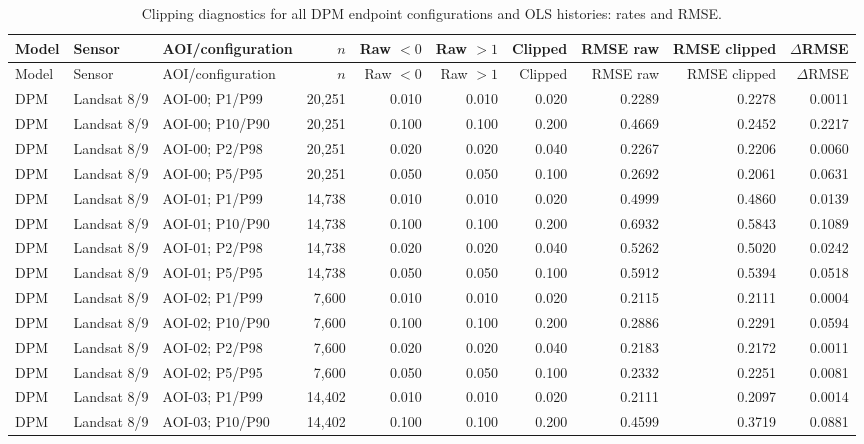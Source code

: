 \begin{landscape}\tiny
\setlength{\LTleft}{0pt}\setlength{\LTright}{0pt}
\begin{longtable}{lllrrrrrrr}
\caption{Clipping diagnostics for all DPM endpoint configurations and OLS histories: rates and RMSE.}\label{tab:clipping-full}\\
\toprule Model & Sensor & AOI/configuration & $n$ & Raw $<0$ & Raw $>1$ & Clipped & RMSE raw & RMSE clipped & $\Delta$RMSE \\ \midrule
\endfirsthead
\toprule Model & Sensor & AOI/configuration & $n$ & Raw $<0$ & Raw $>1$ & Clipped & RMSE raw & RMSE clipped & $\Delta$RMSE \\ \midrule
\endhead
DPM & Landsat 8/9 & AOI-00; P1/P99 & 20,251 & 0.010 & 0.010 & 0.020 & 0.2289 & 0.2278 & 0.0011 \\
DPM & Landsat 8/9 & AOI-00; P10/P90 & 20,251 & 0.100 & 0.100 & 0.200 & 0.4669 & 0.2452 & 0.2217 \\
DPM & Landsat 8/9 & AOI-00; P2/P98 & 20,251 & 0.020 & 0.020 & 0.040 & 0.2267 & 0.2206 & 0.0060 \\
DPM & Landsat 8/9 & AOI-00; P5/P95 & 20,251 & 0.050 & 0.050 & 0.100 & 0.2692 & 0.2061 & 0.0631 \\
DPM & Landsat 8/9 & AOI-01; P1/P99 & 14,738 & 0.010 & 0.010 & 0.020 & 0.4999 & 0.4860 & 0.0139 \\
DPM & Landsat 8/9 & AOI-01; P10/P90 & 14,738 & 0.100 & 0.100 & 0.200 & 0.6932 & 0.5843 & 0.1089 \\
DPM & Landsat 8/9 & AOI-01; P2/P98 & 14,738 & 0.020 & 0.020 & 0.040 & 0.5262 & 0.5020 & 0.0242 \\
DPM & Landsat 8/9 & AOI-01; P5/P95 & 14,738 & 0.050 & 0.050 & 0.100 & 0.5912 & 0.5394 & 0.0518 \\
DPM & Landsat 8/9 & AOI-02; P1/P99 & 7,600 & 0.010 & 0.010 & 0.020 & 0.2115 & 0.2111 & 0.0004 \\
DPM & Landsat 8/9 & AOI-02; P10/P90 & 7,600 & 0.100 & 0.100 & 0.200 & 0.2886 & 0.2291 & 0.0594 \\
DPM & Landsat 8/9 & AOI-02; P2/P98 & 7,600 & 0.020 & 0.020 & 0.040 & 0.2183 & 0.2172 & 0.0011 \\
DPM & Landsat 8/9 & AOI-02; P5/P95 & 7,600 & 0.050 & 0.050 & 0.100 & 0.2332 & 0.2251 & 0.0081 \\
DPM & Landsat 8/9 & AOI-03; P1/P99 & 14,402 & 0.010 & 0.010 & 0.020 & 0.2111 & 0.2097 & 0.0014 \\
DPM & Landsat 8/9 & AOI-03; P10/P90 & 14,402 & 0.100 & 0.100 & 0.200 & 0.4599 & 0.3719 & 0.0881 \\

\end{longtable}
\end{landscape}
